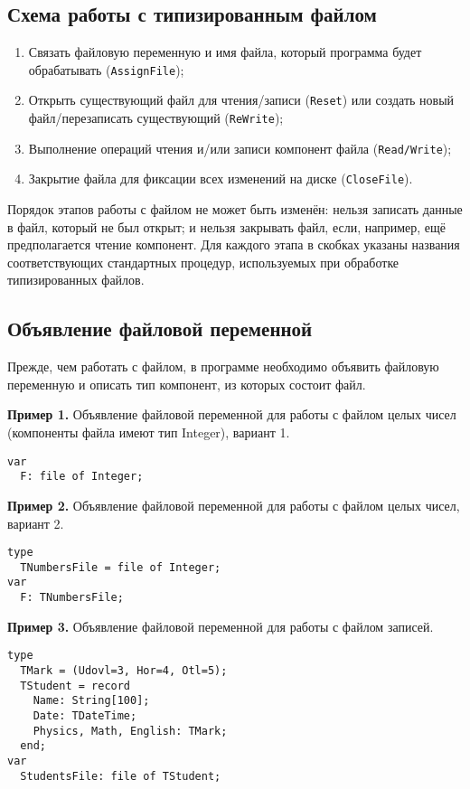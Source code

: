 \documentclass[10pt,a4paper]{report}
\begin{document}
\subsection*{Схема работы с типизированным файлом}
\begin{enumerate}
\item Связать файловую переменную и имя файла, который программа будет обрабатывать (\texttt{AssignFile});
\item Открыть существующий файл для чтения/записи (\texttt{Reset}) или создать новый файл/перезаписать существующий (\texttt{ReWrite});
\item Выполнение операций чтения и/или записи компонент файла (\texttt{Read/Write});
\item Закрытие файла для фиксации всех изменений на диске (\texttt{CloseFile}).
\end{enumerate}

Порядок этапов работы с файлом не может быть изменён: нельзя записать данные в файл, который не был открыт; и нельзя закрывать файл, если, например, ещё предполагается чтение компонент. Для каждого этапа в скобках указаны названия соответствующих стандартных процедур, используемых при обработке типизированных файлов.

\subsection*{Объявление файловой переменной}
Прежде, чем работать с файлом, в программе необходимо объявить файловую переменную и описать тип компонент, из которых состоит файл.

\textbf{Пример 1.} Объявление файловой переменной для работы с файлом целых чисел (компоненты файла имеют тип Integer), вариант 1.
\begin{verbatim}
var
  F: file of Integer;
\end{verbatim}

\textbf{Пример 2.} Объявление файловой переменной для работы с файлом целых чисел, вариант 2.
\begin{verbatim}
type
  TNumbersFile = file of Integer;
var
  F: TNumbersFile;
\end{verbatim}

\textbf{Пример 3.} Объявление файловой переменной для работы с файлом записей.
\begin{verbatim}
type
  TMark = (Udovl=3, Hor=4, Otl=5);
  TStudent = record
    Name: String[100];
    Date: TDateTime;
    Physics, Math, English: TMark;
  end;
var
  StudentsFile: file of TStudent;
\end{verbatim}
\end{document}

